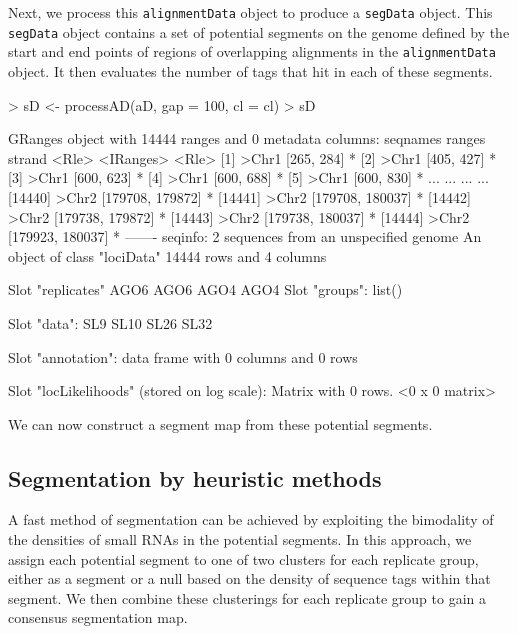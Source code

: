 \documentclass[a4paper]{article}
\begin{document}
Next, we process this \verb'alignmentData' object to produce a \verb'segData' object. This \verb'segData' object contains a set of potential segments on the genome defined by the start and end points of regions of overlapping alignments in the \verb'alignmentData' object. It then evaluates the number of tags that hit in each of these segments.

\begin{Schunk}
\begin{Sinput}
> sD <- processAD(aD, gap = 100, cl = cl)
> sD
\end{Sinput}
\begin{Soutput}
GRanges object with 14444 ranges and 0 metadata columns:
          seqnames           ranges strand
             <Rle>        <IRanges>  <Rle>
      [1]    >Chr1       [265, 284]      *
      [2]    >Chr1       [405, 427]      *
      [3]    >Chr1       [600, 623]      *
      [4]    >Chr1       [600, 688]      *
      [5]    >Chr1       [600, 830]      *
      ...      ...              ...    ...
  [14440]    >Chr2 [179708, 179872]      *
  [14441]    >Chr2 [179708, 180037]      *
  [14442]    >Chr2 [179738, 179872]      *
  [14443]    >Chr2 [179738, 180037]      *
  [14444]    >Chr2 [179923, 180037]      *
  -------
  seqinfo: 2 sequences from an unspecified genome
An object of class "lociData"
14444 rows and 4 columns

Slot "replicates"
AGO6 AGO6 AGO4 AGO4
Slot "groups":
list()

Slot "data":
     SL9 SL10 SL26 SL32

Slot "annotation":
data frame with 0 columns and 0 rows

Slot "locLikelihoods" (stored on log scale):
Matrix with  0  rows.
<0 x 0 matrix>
\end{Soutput}
\end{Schunk}



We can now construct a segment map from these potential segments.

\subsection*{Segmentation by heuristic methods}

A fast method of segmentation can be achieved by exploiting the bimodality of the densities of small RNAs in the potential segments. In this approach, we assign each potential segment to one of two clusters for each replicate group, either as a segment or a null based on the density of sequence tags within that segment. We then combine these clusterings for each replicate group to gain a consensus segmentation map.
\end{document}
